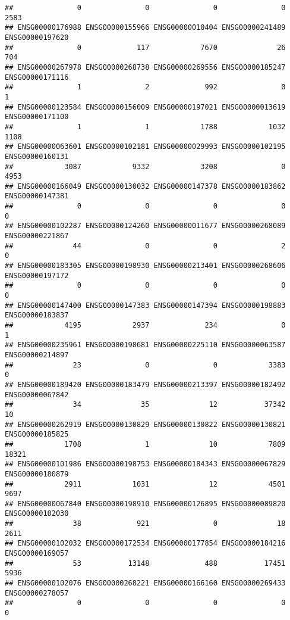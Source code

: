 \documentclass[
]{article}
\begin{document}
\begin{verbatim}
##               0               0               0               0            2583 
## ENSG00000176988 ENSG00000155966 ENSG00000010404 ENSG00000241489 ENSG00000197620 
##               0             117            7670              26             704 
## ENSG00000267978 ENSG00000268738 ENSG00000269556 ENSG00000185247 ENSG00000171116 
##               1               2             992               0               1 
## ENSG00000123584 ENSG00000156009 ENSG00000197021 ENSG00000013619 ENSG00000171100 
##               1               1            1788            1032            1108 
## ENSG00000063601 ENSG00000102181 ENSG00000029993 ENSG00000102195 ENSG00000160131 
##            3087            9332            3208               0            4953 
## ENSG00000166049 ENSG00000130032 ENSG00000147378 ENSG00000183862 ENSG00000147381 
##               0               0               0               0               0 
## ENSG00000102287 ENSG00000124260 ENSG00000011677 ENSG00000268089 ENSG00000221867 
##              44               0               0               2               0 
## ENSG00000183305 ENSG00000198930 ENSG00000213401 ENSG00000268606 ENSG00000197172 
##               0               0               0               0               0 
## ENSG00000147400 ENSG00000147383 ENSG00000147394 ENSG00000198883 ENSG00000183837 
##            4195            2937             234               0               1 
## ENSG00000235961 ENSG00000198681 ENSG00000225110 ENSG00000063587 ENSG00000214897 
##              23               0               0            3383               0 
## ENSG00000189420 ENSG00000183479 ENSG00000213397 ENSG00000182492 ENSG00000067842 
##              34              35              12           37342              10 
## ENSG00000262919 ENSG00000130829 ENSG00000130822 ENSG00000130821 ENSG00000185825 
##            1708               1              10            7809           18321 
## ENSG00000101986 ENSG00000198753 ENSG00000184343 ENSG00000067829 ENSG00000180879 
##            2911            1031              12            4501            9697 
## ENSG00000067840 ENSG00000198910 ENSG00000126895 ENSG00000089820 ENSG00000102030 
##              38             921               0              18            2611 
## ENSG00000102032 ENSG00000172534 ENSG00000177854 ENSG00000184216 ENSG00000169057 
##              53           13148             488           17451            5936 
## ENSG00000102076 ENSG00000268221 ENSG00000166160 ENSG00000269433 ENSG00000278057 
##               0               0               0               0               0 

\end{verbatim}
\end{document}
